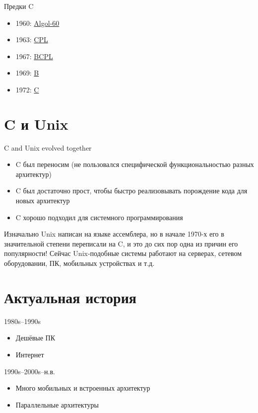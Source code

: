 \documentclass[xetex,aspectratio=169]{beamer}
\begin{document}
\begin{frame}{Предки C}
	\begin{itemize}
		\item 1960: \href{https://en.wikipedia.org/wiki/ALGOL_60\#Code_sample_comparisons}{Algol-60}
		\item 1963: \href{https://en.wikipedia.org/wiki/CPL_(programming_language)\#Example}{CPL}
		\item 1967: \href{https://en.wikipedia.org/wiki/BCPL\#Examples}{BCPL}
		\item 1969: \href{https://en.wikipedia.org/wiki/B_(programming_language)\#Examples}{B}
		\item 1972: \href{https://en.wikipedia.org/wiki/C_(programming_language)\#\%22Hello,_world\%22_example}{C}
	\end{itemize}
\end{frame}

\section{C и Unix}

\begin{frame}{C and Unix evolved together}
	\begin{itemize}
		\item C был переносим (не пользовался специфической функциональностью разных архитектур)
		\item C был достаточно прост, чтобы быстро реализовывать порождение кода для новых архитектур
		\item C хорошо подходил для системного программирования
	\end{itemize}

	\pause
    Изначально Unix написан на языке ассемблера, но в начале 1970-х его в значительной степени переписали на C, и это до сих пор одна из причин его популярности! Сейчас Unix-подобные системы работают на серверах, сетевом оборудовании, ПК, мобильных устройствах и т.д.
\end{frame}

\section{Актуальная история}

\begin{frame}{1980s--1990s}
	\begin{itemize}
	\item Дешёвые ПК
	\item Интернет
	\end{itemize}
\end{frame}

\begin{frame}{1990s--2000s--н.в.}
	\begin{itemize}
		\item Много мобильных и встроенных архитектур
		\item Параллельные архитектуры
	\end{itemize}
\end{frame}

\postamble
\end{document}
